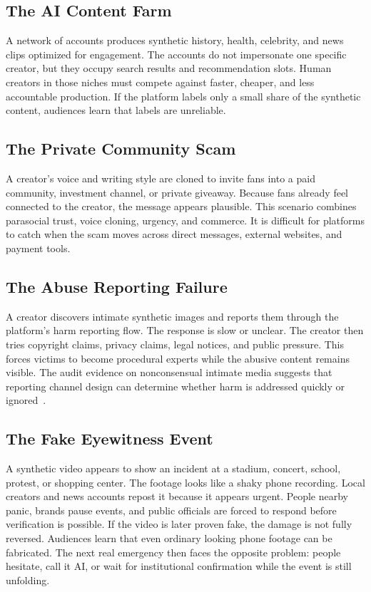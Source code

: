 \documentclass[11pt]{article}
\begin{document}
\subsection{The AI Content Farm}

A network of accounts produces synthetic history, health, celebrity, and news clips optimized for engagement. The accounts do not impersonate one specific creator, but they occupy search results and recommendation slots. Human creators in those niches must compete against faster, cheaper, and less accountable production. If the platform labels only a small share of the synthetic content, audiences learn that labels are unreliable.

\subsection{The Private Community Scam}

A creator's voice and writing style are cloned to invite fans into a paid community, investment channel, or private giveaway. Because fans already feel connected to the creator, the message appears plausible. This scenario combines parasocial trust, voice cloning, urgency, and commerce. It is difficult for platforms to catch when the scam moves across direct messages, external websites, and payment tools.

\subsection{The Abuse Reporting Failure}

A creator discovers intimate synthetic images and reports them through the platform's harm reporting flow. The response is slow or unclear. The creator then tries copyright claims, privacy claims, legal notices, and public pressure. This forces victims to become procedural experts while the abusive content remains visible. The audit evidence on nonconsensual intimate media suggests that reporting channel design can determine whether harm is addressed quickly or ignored~\cite{li2024reporting}.

\subsection{The Fake Eyewitness Event}

A synthetic video appears to show an incident at a stadium, concert, school, protest, or shopping center. The footage looks like a shaky phone recording. Local creators and news accounts repost it because it appears urgent. People nearby panic, brands pause events, and public officials are forced to respond before verification is possible. If the video is later proven fake, the damage is not fully reversed. Audiences learn that even ordinary looking phone footage can be fabricated. The next real emergency then faces the opposite problem: people hesitate, call it AI, or wait for institutional confirmation while the event is still unfolding.
\end{document}
